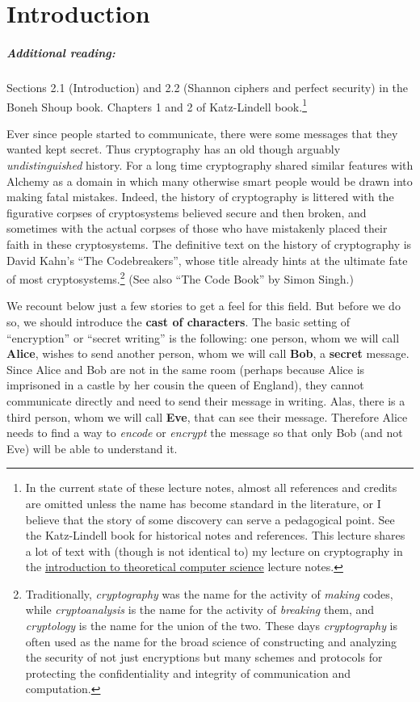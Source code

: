 \chapter{Introduction}\label{Introduction}

\paragraph{Additional reading:} Sections 2.1 (Introduction) and 2.2
(Shannon ciphers and perfect security) in the Boneh Shoup book. Chapters
1 and 2 of Katz-Lindell book.\footnote{In the current state of these
  lecture notes, almost all references and credits are omitted unless
  the name has become standard in the literature, or I believe that the
  story of some discovery can serve a pedagogical point. See the
  Katz-Lindell book for historical notes and references. This lecture
  shares a lot of text with (though is not identical to) my lecture on
  cryptography in the \href{http://introtcs.org}{introduction to
  theoretical computer science} lecture notes.}

Ever since people started to communicate, there were some messages that
they wanted kept secret. Thus cryptography has an old though arguably
\emph{undistinguished} history. For a long time cryptography shared
similar features with Alchemy as a domain in which many otherwise smart
people would be drawn into making fatal mistakes. Indeed, the history of
cryptography is littered with the figurative corpses of cryptosystems
believed secure and then broken, and sometimes with the actual corpses
of those who have mistakenly placed their faith in these cryptosystems.
The definitive text on the history of cryptography is David Kahn's ``The
Codebreakers'', whose title already hints at the ultimate fate of most
cryptosystems.\footnote{Traditionally, \emph{cryptography} was the name
  for the activity of \emph{making} codes, while \emph{cryptoanalysis}
  is the name for the activity of \emph{breaking} them, and
  \emph{cryptology} is the name for the union of the two. These days
  \emph{cryptography} is often used as the name for the broad science of
  constructing and analyzing the security of not just encryptions but
  many schemes and protocols for protecting the confidentiality and
  integrity of communication and computation.} (See also ``The Code
Book'' by Simon Singh.)

We recount below just a few stories to get a feel for this field. But
before we do so, we should introduce the \textbf{cast of characters}.
The basic setting of ``encryption'' or ``secret writing'' is the
following: one person, whom we will call \textbf{Alice}, wishes to send
another person, whom we will call \textbf{Bob}, a \textbf{secret}
message. Since Alice and Bob are not in the same room (perhaps because
Alice is imprisoned in a castle by her cousin the queen of England),
they cannot communicate directly and need to send their message in
writing. Alas, there is a third person, whom we will call \textbf{Eve},
that can see their message. Therefore Alice needs to find a way to
\emph{encode} or \emph{encrypt} the message so that only Bob (and not
Eve) will be able to understand it.

